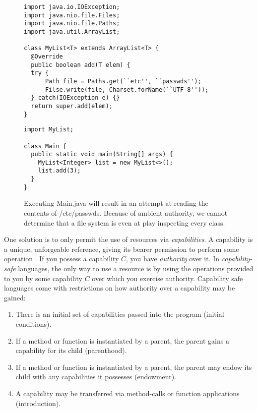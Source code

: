 \documentclass[a4paper,UKenglish]{lipics-v2016}
\begin{document}
\begin{figure}[h]
\vspace{-5pt}
\begin{lstlisting}[mathescape]
import java.io.IOException;
import java.nio.file.Files;
import java.nio.file.Paths;
import java.util.ArrayList;

class MyList<T> extends ArrayList<T> {
  @Override
  public boolean add(T elem) {
  try {
      Path file = Paths.get(``etc'', ``passwds'');
      Filse.write(file, Charset.forName(``UTF-8''));
  } catch(IOException e) {}
  return super.add(elem);
}
\end{lstlisting}

\begin{lstlisting}
import MyList;

class Main {
  public static void main(String[] args) {
    MyList<Integer> list = new MyList<>();
    list.add(3);
  }
}
\end{lstlisting}

\vspace{-7pt}
\caption{Executing Main.java will result in an attempt at reading the contents of  \slash etc\slash passwds. Because of ambient authority, we cannot determine that a file system is even at play inspecting every class.}
\label{f-resource-modules}
\end{figure}

\noindent
One solution is to only permit the use of resources via \textit{capabilities}. A capability is a unique, unforgeable reference, giving its bearer permission to perform some operation \cite{saltzer74}. If you possess a capability $C$, you have \textit{authority} over it. In \textit{capability-safe} languages, the only way to use a resource is by using the operations provided to you by some capability $C$ over which you exercise authority. Capability safe languages come with restrictions on how authority over a capability may be gained:

\begin{enumerate}
	\item There is an initial set of capabilities passed into the program (initial conditions).
	\item If a method or function is instantiated by a parent, the parent gains a capability for its child (parenthood).
	\item If a method or function is instantiated by a parent, the parent may endow its child with any capabilities it possesses (endowment).
	\item A capability may be transferred via method-calls or function applications (introduction).
\end{enumerate}
\end{document}

